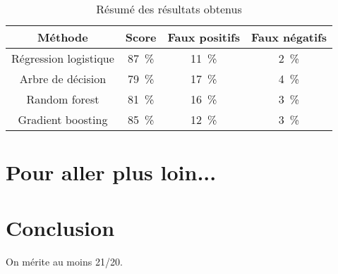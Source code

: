 \documentclass[11pt,a4paper]{article}
\begin{document}
	\begin{table}
	\begin{center}
	\begin{tabular}{cccc}
		\toprule
		Méthode  &	Score  &	Faux positifs  &	Faux négatifs \\
		\midrule
		Régression logistique 	& \SI{87}{\percent} 	 &	\SI{11}{\percent}  	& \SI{2}{\percent} \\
		Arbre de décision & \SI{79}{\percent} & \SI{17}{\percent} & \SI{4}{\percent} \\
		Random forest & \SI{81}{\percent} & \SI{16}{\percent} & \SI{3}{\percent} \\
		Gradient boosting & \SI{85}{\percent} & \SI{12}{\percent} & \SI{3}{\percent} \\
		\bottomrule
	\end{tabular}
	\caption{Résumé des résultats obtenus \label{table:results}}
	\end{center}
\end{table}

\section{Pour aller plus loin...}

\section{Conclusion}
	On mérite au moins 21/20.




%
\end{document}
